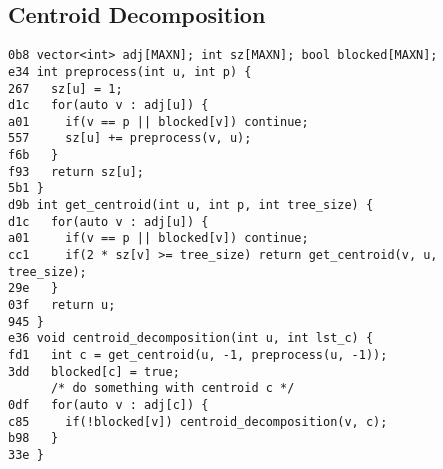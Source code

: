\documentclass[10pt, a4paper, twoside]{article}
\begin{document}
\subsection{Centroid Decomposition}
\begin{lstlisting}
0b8 vector<int> adj[MAXN]; int sz[MAXN]; bool blocked[MAXN];
e34 int preprocess(int u, int p) {
267   sz[u] = 1;
d1c   for(auto v : adj[u]) {
a01     if(v == p || blocked[v]) continue;
557     sz[u] += preprocess(v, u);
f6b   }
f93   return sz[u];
5b1 }
d9b int get_centroid(int u, int p, int tree_size) {
d1c   for(auto v : adj[u]) {
a01     if(v == p || blocked[v]) continue;
cc1     if(2 * sz[v] >= tree_size) return get_centroid(v, u, tree_size);
29e   }
03f   return u;
945 }
e36 void centroid_decomposition(int u, int lst_c) {
fd1   int c = get_centroid(u, -1, preprocess(u, -1));
3dd   blocked[c] = true;
      /* do something with centroid c */
0df   for(auto v : adj[c]) {
c85     if(!blocked[v]) centroid_decomposition(v, c);
b98   }
33e }
\end{lstlisting}
\end{document}
